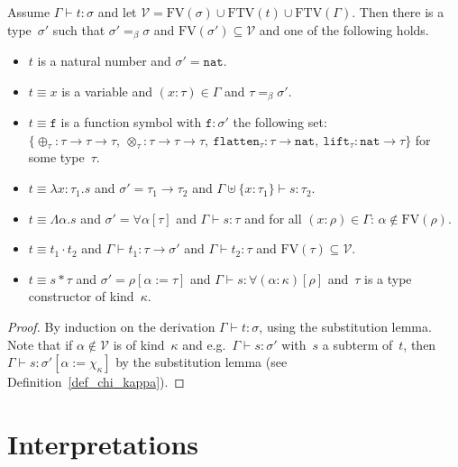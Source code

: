 \documentclass[runningheads,a4paper]{llncs}
\newcommand{\quant}[2]{\forall #1[#2]}
\newcommand{\arrtype}{\rightarrow}
\newcommand{\abs}[2]{\lambda #1.#2}
\newcommand{\tabs}[2]{\Lambda #1.#2}
\newcommand{\app}[2]{#1 \cdot #2}
\newcommand{\tapp}[2]{#1 * #2}
\newcommand{\subst}[2]{#1:=#2}
\newcommand{\FTV}{\mathrm{FTV}}
\newcommand{\FV}{\mathrm{FV}}
\newcommand{\Vc}{\mathcal{V}}
\newcommand{\nat}{\mathtt{nat}}
\newcommand{\flatten}{\mathtt{flatten}}
\newcommand{\lift}{\mathtt{lift}}
\newcommand{\proves}{\vdash}
\begin{document}
\begin{lemma}
  Assume $\Gamma \proves t : \sigma$ and let
  $\Vc = \FV(\sigma) \cup \FTV(t) \cup \FTV(\Gamma)$. Then there is a
  type~$\sigma'$ such that $\sigma' =_\beta \sigma$ and
  $\FV(\sigma') \subseteq \Vc$ and one of the following holds.
  \begin{itemize}
  \item $t$ is a natural number and $\sigma' = \nat$.
  \item $t \equiv x$ is a variable and $(x : \tau) \in \Gamma$ and $\tau
    =_\beta \sigma'$.
  \item $t \equiv \mathtt{f}$ is a function symbol with $\mathtt{f} :
    \sigma'$ the following set: $\{ \oplus_{\tau} : \tau \arrtype \tau
    \arrtype \tau,\ \otimes_{\tau} : \tau \arrtype \tau \arrtype
    \tau,\ \flatten_{\tau} : \tau \arrtype \nat,\ \lift_{\tau} : \nat
    \arrtype \tau \}$ for some type~$\tau$.
  \item $t \equiv \abs{x:\tau_1}{s}$ and
    $\sigma'=\tau_1\arrtype\tau_2$ and $\Gamma \uplus \{ x : \tau_1 \}
    \vdash s : \tau_2$.
  \item $t \equiv \tabs{\alpha}{s}$ and
    $\sigma' = \quant{\alpha}{\tau}$ and $\Gamma \vdash s : \tau$ and
    for all $(x : \rho) \in \Gamma$: $\alpha \notin \FV(\rho)$.
  \item $t \equiv \app{t_1}{t_2}$ and
    $\Gamma \vdash t_1 : \tau \arrtype \sigma'$ and
    $\Gamma \vdash t_2 : \tau$ and $\FV(\tau) \subseteq \Vc$.
  \item $t \equiv \tapp{s}{\tau}$ and
    $\sigma' = \rho[\subst{\alpha}{\tau}]$ and
    $\Gamma \vdash s : \quant{(\alpha:\kappa)}{\rho}$ and~$\tau$ is a
    type constructor of kind~$\kappa$.
  \end{itemize}
\end{lemma}

\begin{proof}
  By induction on the derivation $\Gamma \proves t : \sigma$, using
  the substitution lemma. Note that if $\alpha \notin \Vc$ is of
  kind~$\kappa$ and e.g.~$\Gamma \proves s : \sigma'$ with~$s$ a
  subterm of~$t$, then
  $\Gamma \proves s : \sigma'[\subst{\alpha}{\chi_\kappa}]$ by the
  substitution lemma (see Definition~\ref{def_chi_kappa}).
\end{proof}

\section{Interpretations}
\end{document}
